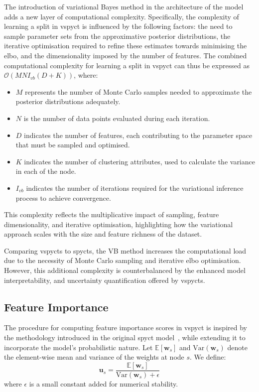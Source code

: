 \documentclass[3p,review,authoryear]{elsarticle}
\begin{document}
The introduction of variational Bayes method in the architecture of the model adds a new layer of computational complexity.
Specifically, the complexity of learning a split in \gls{vspyct} is influenced by the following factors: the need to sample parameter sets from the approximative posterior distributions, the iterative optimisation required to refine these estimates towards minimising the \gls{elbo}, and the dimensionality imposed by the number of features.
The combined computational complexity for learning a split in \gls{vspyct} can thus be expressed as $\mathcal{O}(MNI_{vb}(D+K))$, where:
\begin{itemize}
\item $M$ represents the number of Monte Carlo samples needed to approximate the posterior distributions adequately.
\item $N$ is the number of data points evaluated during each iteration.
\item $D$ indicates the number of features, each contributing to the parameter space that must be sampled and optimised.
\item $K$ indicates the number of clustering attributes, used to calculate the variance in each of the node.
\item $I_{vb}$ indicates the number of iterations required for the variational inference process to achieve convergence.
\end{itemize}
This complexity reflects the multiplicative impact of sampling, feature dimensionality, and iterative optimisation, highlighting how the variational approach scales with the size and feature richness of the dataset.

Comparing \glspl{vspyct} to \glspl{spyct}, the VB method increases the computational load due to the necessity of Monte Carlo sampling and iterative \gls{elbo} optimisation.
However, this additional complexity is counterbalanced by the enhanced model interpretability, and uncertainty quantification offered by \glspl{vspyct}.

\subsection{Feature Importance}

The procedure for computing feature importance scores in \gls{vspyct} is inspired by the methodology introduced in the original \gls{spyct} model~\citep{Stepi_nik_2021}, while extending it to incorporate the model’s probabilistic nature.
Let \(\mathbb{E}[\mathbf{w}_s]\) and \(\text{Var}(\mathbf{w}_s)\) denote the element-wise mean and variance of the weights at node \(s\). We define:
\[
\mathbf{u}_s = \frac{\mathbb{E}[\mathbf{w}_s]}{\text{Var}(\mathbf{w}_s) + \epsilon}
\]
where \(\epsilon\) is a small constant added for numerical stability.
\end{document}
